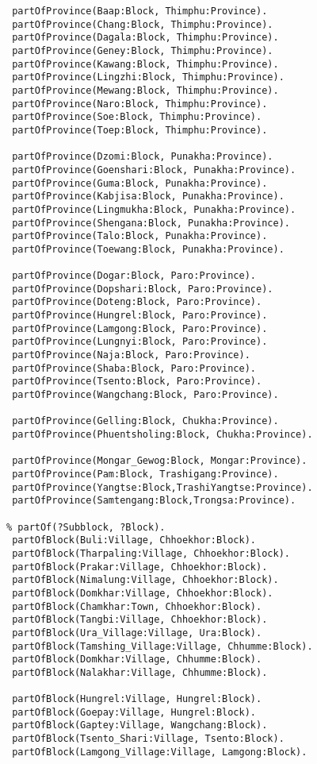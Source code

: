 \begin{verbatim}
 partOfProvince(Baap:Block, Thimphu:Province).
 partOfProvince(Chang:Block, Thimphu:Province).
 partOfProvince(Dagala:Block, Thimphu:Province).
 partOfProvince(Geney:Block, Thimphu:Province).
 partOfProvince(Kawang:Block, Thimphu:Province).
 partOfProvince(Lingzhi:Block, Thimphu:Province).
 partOfProvince(Mewang:Block, Thimphu:Province).
 partOfProvince(Naro:Block, Thimphu:Province).
 partOfProvince(Soe:Block, Thimphu:Province).
 partOfProvince(Toep:Block, Thimphu:Province).

 partOfProvince(Dzomi:Block, Punakha:Province).
 partOfProvince(Goenshari:Block, Punakha:Province).
 partOfProvince(Guma:Block, Punakha:Province).
 partOfProvince(Kabjisa:Block, Punakha:Province).
 partOfProvince(Lingmukha:Block, Punakha:Province).
 partOfProvince(Shengana:Block, Punakha:Province).
 partOfProvince(Talo:Block, Punakha:Province).
 partOfProvince(Toewang:Block, Punakha:Province).

 partOfProvince(Dogar:Block, Paro:Province).
 partOfProvince(Dopshari:Block, Paro:Province).
 partOfProvince(Doteng:Block, Paro:Province).
 partOfProvince(Hungrel:Block, Paro:Province).
 partOfProvince(Lamgong:Block, Paro:Province).
 partOfProvince(Lungnyi:Block, Paro:Province).
 partOfProvince(Naja:Block, Paro:Province).
 partOfProvince(Shaba:Block, Paro:Province).
 partOfProvince(Tsento:Block, Paro:Province).
 partOfProvince(Wangchang:Block, Paro:Province).

 partOfProvince(Gelling:Block, Chukha:Province).
 partOfProvince(Phuentsholing:Block, Chukha:Province).

 partOfProvince(Mongar_Gewog:Block, Mongar:Province).
 partOfProvince(Pam:Block, Trashigang:Province).
 partOfProvince(Yangtse:Block,TrashiYangtse:Province).
 partOfProvince(Samtengang:Block,Trongsa:Province).

% partOf(?Subblock, ?Block).
 partOfBlock(Buli:Village, Chhoekhor:Block).
 partOfBlock(Tharpaling:Village, Chhoekhor:Block).
 partOfBlock(Prakar:Village, Chhoekhor:Block).
 partOfBlock(Nimalung:Village, Chhoekhor:Block).
 partOfBlock(Domkhar:Village, Chhoekhor:Block).
 partOfBlock(Chamkhar:Town, Chhoekhor:Block).
 partOfBlock(Tangbi:Village, Chhoekhor:Block).
 partOfBlock(Ura_Village:Village, Ura:Block).
 partOfBlock(Tamshing_Village:Village, Chhumme:Block).
 partOfBlock(Domkhar:Village, Chhumme:Block).
 partOfBlock(Nalakhar:Village, Chhumme:Block).

 partOfBlock(Hungrel:Village, Hungrel:Block).
 partOfBlock(Goepay:Village, Hungrel:Block).
 partOfBlock(Gaptey:Village, Wangchang:Block).
 partOfBlock(Tsento_Shari:Village, Tsento:Block).
 partOfBlock(Lamgong_Village:Village, Lamgong:Block).


\end{verbatim}
